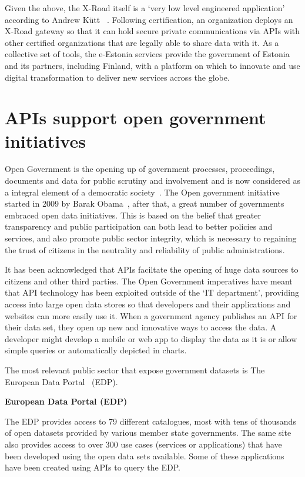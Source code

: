 Given the above, the X-Road itself is a ‘very low level engineered application’
according to Andrew Kütt ~\citep{andrew_kutt}. Following certification, an organization
deploys an X-Road gateway
so that it can hold secure private communications via APIs with other certified
organizations that are legally able to share data with it. As a collective set 
of tools, the e-Estonia services provide the government of Estonia and its partners,
including Finland, with a platform on which to innovate and use digital
transformation to deliver new services across the globe.

\section{APIs support open government initiatives}

Open Government is the opening up of government processes,
proceedings, documents and data for public scrutiny and involvement and is
now considered as a integral element of a democratic society~\citep{open_gov}.
The Open government initiative started in 2009 by Barak Obama~\citep{whitehouse_archives}, after that,
a great number of governments embraced open data initiatives. This is based on the
belief that greater transparency and public participation can both lead
to better policies and services, and also promote public sector
integrity, which is necessary to regaining the trust of citizens in the
neutrality and reliability of public administrations.

It has been acknowledged that APIs faciltate the opening of huge data sources
to citizens and other third parties. The Open Government imperatives have meant
that API technology has been exploited outside of the ‘IT department’,
providing access into large open data stores so that developers and their
applications and websites can more easily use it. When a government agency
publishes an API for their data set, they open up new and innovative ways to
access the data. A developer might develop a mobile or web app to display the
data as it is or allow simple queries or automatically depicted in charts.

The most relevant public sector that expose government datasets is The European
Data Portal~\citep{edp_use_cases} (EDP).

\textbf{European Data Portal (EDP)}

The EDP provides access to 79 different catalogues, most with tens of thousands of
open datasets provided by various member state governments. The same site also provides
access to over 300 use cases (services or applications) that have been developed
using the open data sets available. Some of these applications have been created
using APIs to query the EDP.

